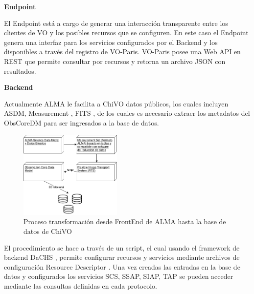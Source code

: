 \textbf{Endpoint}

El Endpoint está a cargo de generar una interacción transparente entre los clientes de VO y los posibles recursos que se configuren. En este caso el Endpoint genera una interfaz para los servicios configurados por el Backend y los disponibles a través del registro de VO-Paris. VO-Paris posee una Web API en REST que permite consultar por recursos y retorna un archivo JSON con resultados.

\textbf{Backend}

Actualmente ALMA le facilita a ChiVO datos públicos, los cuales incluyen ASDM, Measurement \cite{petry2012analysing}, FITS \cite{wells1981fits}, de los cuales es necesario extraer los metadatos del ObsCoreDM para ser ingresados a la base de datos.

\begin{figure}[h]
    \centering
    \includegraphics[width=0.45\textwidth]{images/metadata.png}
    \caption{Proceso transformación desde FrontEnd de ALMA hasta la base de datos de ChiVO}
    \label{fig:metadata}
\end{figure}

El procedimiento se hace a través de un script, el cual usando el framework de backend DaCHS \cite{dachs}, permite configurar recursos y servicios mediante archivos de configuración Resource Descriptor \cite{dachsorguide}. Una vez creadas las entradas en la base de datos y configurados los servicios SCS, SSAP, SIAP, TAP se pueden acceder mediante las consultas definidas en cada protocolo.




